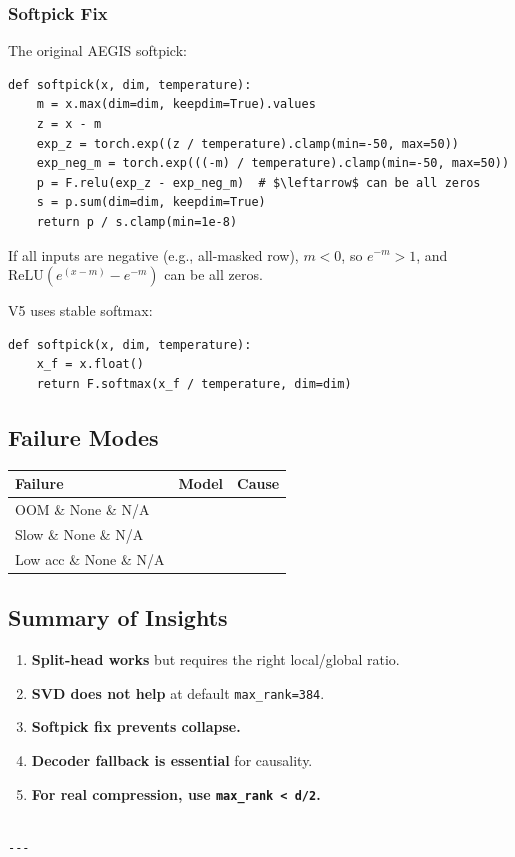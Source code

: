 \subsubsection{Softpick Fix}

The original AEGIS softpick:

\begin{lstlisting}
def softpick(x, dim, temperature):
    m = x.max(dim=dim, keepdim=True).values
    z = x - m
    exp_z = torch.exp((z / temperature).clamp(min=-50, max=50))
    exp_neg_m = torch.exp(((-m) / temperature).clamp(min=-50, max=50))
    p = F.relu(exp_z - exp_neg_m)  # $\leftarrow$ can be all zeros
    s = p.sum(dim=dim, keepdim=True)
    return p / s.clamp(min=1e-8)
\end{lstlisting}

If all inputs are negative (e.g., all-masked row), $m < 0$, so 
$e^{-m} > 1$, and $\text{ReLU}(e^{(x-m)} - e^{-m})$ can be all zeros.

V5 uses stable softmax:

\begin{lstlisting}
def softpick(x, dim, temperature):
    x_f = x.float()
    return F.softmax(x_f / temperature, dim=dim)
\end{lstlisting}

\subsection{Failure Modes}

\begin{table}[H]
\centering
\small
\begin{tabular}{lll}
\toprule
\textbf{Failure} & \textbf{Model} & \textbf{Cause} \\
\midrule
OOM \& None \& N/A \\
Slow \& None \& N/A \\
Low acc \& None \& N/A \\
\bottomrule
\end{tabular}
\end{table}

\subsection{Summary of Insights}

\begin{enumerate}
\item \textbf{Split-head works} but requires the right local/global ratio.
\item \textbf{SVD does not help} at default \texttt{max\_rank=384}.
\item \textbf{Softpick fix prevents collapse.}
\item \textbf{Decoder fallback is essential} for causality.
\item \textbf{For real compression, use \texttt{max\_rank < d/2}.}
\end{enumerate}
\begin{lstlisting}

---
\end{lstlisting}